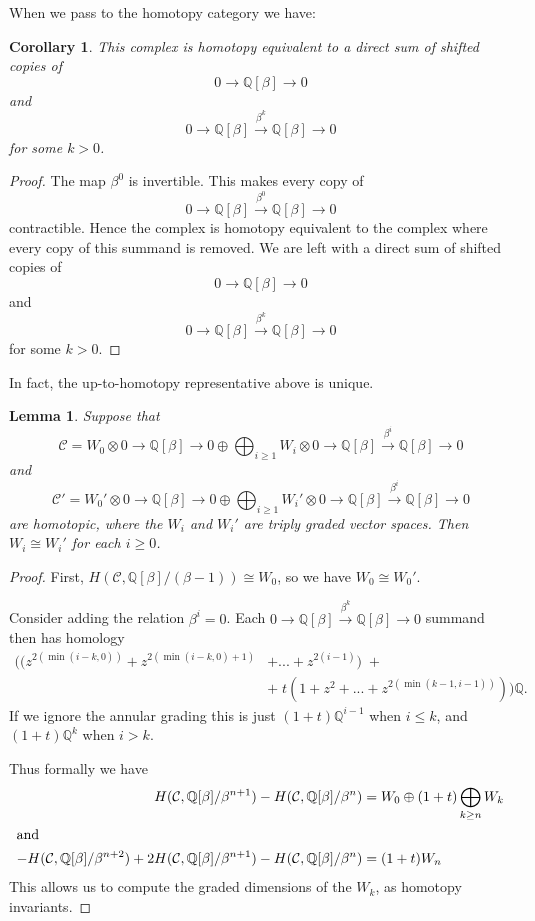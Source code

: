 \documentclass{amsart}
\theoremstyle{plain}
\newtheorem{lem}[prop]{Lemma}
\newtheorem{cor}[prop]{Corollary}
\newcommand{\complexzero}{0\rightarrow\mathbb Q [\beta]\rightarrow 0}
\newcommand{\complexk}[1]{0\rightarrow\mathbb Q [\beta]\xrightarrow{\beta^{#1}}{}\mathbb Q [\beta]\rightarrow 0}
\begin{document}
When we pass to the homotopy category we have:

\begin{cor}
This complex is homotopy equivalent to a direct sum of shifted copies of
\[
\complexzero
\] 
and
\[
\complexk{k}
\]
for some $k > 0$.

\end{cor}
\begin{proof}
The map $\beta^0$ is invertible. This makes every copy of 
\[
\complexk{0}
\]
contractible. Hence the complex is homotopy equivalent to the complex where every copy of this summand is removed. We are left with a direct sum of shifted copies of
\[
\complexzero
\]
and
\[
\complexk{k}
\]
for some $k > 0$.
\end{proof}

In fact, the up-to-homotopy representative above is unique.
\begin{lem}
Suppose that 
$$ \mathcal C = W_0 \otimes \complexzero \oplus \bigoplus_{i \geq 1} W_i \otimes \complexk{i} $$
and 
$$ \mathcal C' = W_0' \otimes \complexzero \oplus \bigoplus_{i \geq 1} W_i' \otimes \complexk{i} $$
are homotopic, where the $W_i$ and $W_i'$ are triply graded vector spaces.
Then $W_i \cong W_i'$ for each $i \geq 0$.
\end{lem}
\begin{proof}
First, $H(\mathcal C, \mathbb Q[\beta]/(\beta - 1)) \cong W_0$, so we have $W_0 \cong W_0'$.

Consider adding the relation $\beta^i = 0$. Each $\complexk{k}$ summand then has homology
\begin{align*}
\Big((z^{2(\min(i-k,0))} + z^{2(\min(i-k,0)+1)} & + ... + z^{2(i-1)}) \;+  \\
 &  + \;t(1 + z^2 + ... + z^{2(\min(k-1,i-1))})\Big)\mathbb Q.
\end{align*}
If we ignore the annular grading this is just
$(1+t) \mathbb Q^{i-1}$ when $i \leq k$, and $(1+t) \mathbb Q^k$ when $i > k$.

Thus formally we have
\begin{align*}
H(\mathcal C, \mathbb Q[\beta]/\beta^{n+1}) - H(\mathcal C, \mathbb Q[\beta]/\beta^n) & = W_0 \oplus (1+t) \bigoplus_{k \geq n} W_k \\
\intertext{and}
- H(\mathcal C, \mathbb Q[\beta]/\beta^{n+2}) + 2 H(\mathcal C, \mathbb Q[\beta]/\beta^{n+1}) -  H(\mathcal C, \mathbb Q[\beta]/\beta^{n}) & = (1+t) W_n 
\end{align*}
This allows us
to compute the graded dimensions of the $W_k$, as homotopy invariants.
\end{proof}
\end{document}
